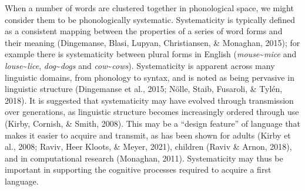 \documentclass[
  man]{apa6}
\begin{document}
When a number of words are clustered together in phonological space, we might consider them to be phonologically systematic. Systematicity is typically defined as a consistent mapping between the properties of a series of word forms and their meaning (Dingemanse, Blasi, Lupyan, Christiansen, \& Monaghan, 2015); for example there is systematicity between plural forms in English (\emph{mouse}\textasciitilde{}\emph{mice} and \emph{louse}\textasciitilde{}\emph{lice}, \emph{dog}\textasciitilde{}\emph{dogs} and \emph{cow}\textasciitilde{}\emph{cows}). Systematicity is apparent across many linguistic domains, from phonology to syntax, and is noted as being pervasive in linguistic structure (Dingemanse et al., 2015; Nölle, Staib, Fusaroli, \& Tylén, 2018). It is suggested that systematicity may have evolved through transmission over generations, as linguistic structure becomes increasingly ordered through use (Kirby, Cornish, \& Smith, 2008). This may be a ``design feature'' of language that makes it easier to acquire and transmit, as has been shown for adults (Kirby et al., 2008; Raviv, Heer Kloots, \& Meyer, 2021), children (Raviv \& Arnon, 2018), and in computational research (Monaghan, 2011). Systematicity may thus be important in supporting the cognitive processes required to acquire a first language.
\end{document}
